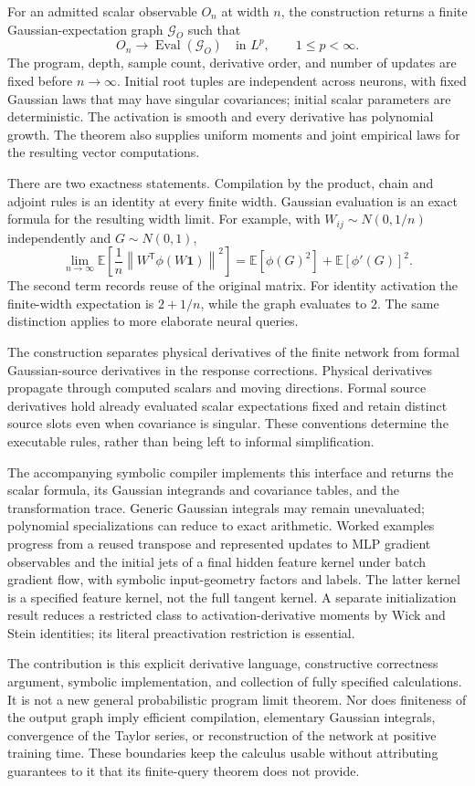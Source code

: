 For an admitted scalar observable $O_n$ at width $n$, the construction
returns a finite Gaussian-expectation graph $\mathcal G_O$ such that
\[
  O_n \longrightarrow \operatorname{Eval}(\mathcal G_O)
  \quad\text{in }L^p,\qquad 1\leq p<\infty.
\]
The program, depth, sample count, derivative order, and number of updates
are fixed before $n\to\infty$. Initial root tuples are independent across
neurons, with fixed Gaussian laws that may have singular covariances;
initial scalar parameters are deterministic. The activation is smooth and
every derivative has polynomial growth. The theorem also supplies uniform
moments and joint empirical laws for the resulting vector computations.

There are two exactness statements. Compilation by the product, chain and
adjoint rules is an identity at every finite width. Gaussian evaluation is
an exact formula for the resulting width limit. For example, with
$W_{ij}\sim N(0,1/n)$ independently and $G\sim N(0,1)$,
\[
 \lim_{n\to\infty}\mathbb E
 \left[\frac1n\left\|W^{\mathsf T}\phi(W\mathbf1)\right\|^2\right]
 =\mathbb E[\phi(G)^2]+\mathbb E[\phi'(G)]^2.
\]
The second term records reuse of the original matrix. For identity
activation the finite-width expectation is $2+1/n$, while the graph
evaluates to $2$. The same distinction applies to more elaborate neural
queries.

The construction separates physical derivatives of the finite network from
formal Gaussian-source derivatives in the response corrections. Physical
derivatives propagate through computed scalars and moving directions.
Formal source derivatives hold already evaluated scalar expectations fixed
and retain distinct source slots even when covariance is singular. These
conventions determine the executable rules, rather than being left to
informal simplification.

The accompanying symbolic compiler implements this interface and returns
the scalar formula, its Gaussian integrands and covariance tables, and the
transformation trace. Generic Gaussian integrals may remain unevaluated;
polynomial specializations can reduce to exact arithmetic. Worked examples
progress from a reused transpose and represented updates to MLP gradient
observables and the initial jets of a final hidden feature kernel under
batch gradient flow, with symbolic input-geometry factors and labels.
The latter kernel is a specified feature kernel, not the full tangent
kernel. A separate initialization result reduces a restricted class to
activation-derivative moments by Wick and Stein identities; its literal
preactivation restriction is essential.

The contribution is this explicit derivative language, constructive
correctness argument, symbolic implementation, and collection of fully
specified calculations. It is not a new general probabilistic program
limit theorem. Nor does finiteness of the output graph imply efficient
compilation, elementary Gaussian integrals, convergence of the Taylor
series, or reconstruction of the network at positive training time.
These boundaries keep the calculus usable without attributing guarantees
to it that its finite-query theorem does not provide.
